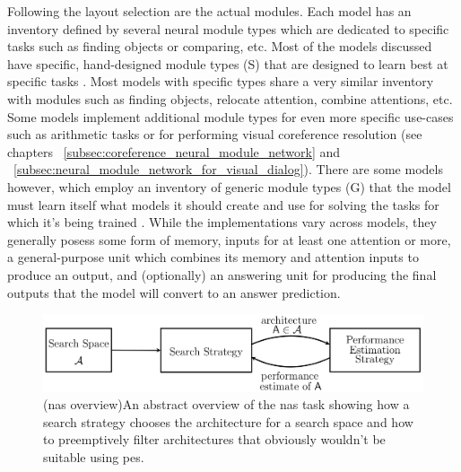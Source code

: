 Following the layout selection are the actual modules.
Each model has an inventory defined by several neural module types which are dedicated to specific tasks such as finding objects or comparing, etc.
Most of the models discussed have specific, hand-designed module types (S) that are designed to learn best at specific tasks \cite{andreas_deep_2016,hu_learning_2017,hu_explainable_2019,chen_teaching_2022,su_toward_2020,kottur_visual_2018,cho_visual_2021}.
Most models with specific types share a very similar inventory with modules such as finding objects, relocate attention, combine attentions, etc.
Some models implement additional module types for even more specific use-cases such as arithmetic tasks \cite{chen_teaching_2022} or for performing visual coreference resolution \cite[text]{kottur_visual_2018,cho_visual_2021} (see chapters ~\ref{subsec:coreference_neural_module_network} and ~\ref{subsec:neural_module_network_for_visual_dialog}).
There are some models however, which employ an inventory of generic module types (G) that the model must learn itself what models it should create and use for solving the tasks for which it's being trained \cite{hudson_compositional_2018,pahuja_learning_2019,chen_meta_2020}.
While the implementations vary across models, they generally posess some form of memory, inputs for at least one attention or more, a general-purpose unit which combines its memory and attention inputs to produce an output, and (optionally) an answering unit for producing the final outputs that the model will convert to an answer prediction.

\begin{figure}[htbp]
    \centering
    \includegraphics[width=\textwidth,keepaspectratio]{content/chapters/literature_review/discussion/figures/neural_architecture_search_overview.png}
    \captionsource(\acrshort{nas} overview){An abstract overview of the \acrshort{nas} task showing how a search strategy chooses the architecture for a search space and how to preemptively filter architectures that obviously wouldn't be suitable using \acrshort{pes}.\label{fig:neural_architecture_search_overview}}{\citeauthor{elsken_neural_2019}\cite{elsken_neural_2019}}
\end{figure}

